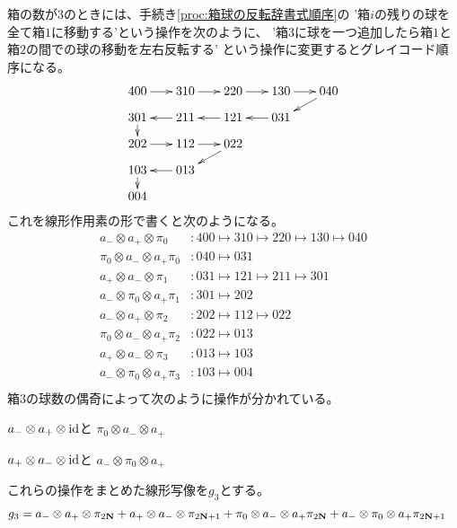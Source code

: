	箱の数が$3$のときには、手続き\ref{proc:箱球の反転辞書式順序}の
	'箱$i$の残りの球を全て箱$1$に移動する'という操作を次のように、
	'箱$3$に球を一つ追加したら箱$1$と箱$2$の間での球の移動を左右反転する'
	という操作に変更するとグレイコード順序になる。
	\begin{equation*}\xymatrix@R=2ex@C=4ex{ %
		400\ar[r] & 310\ar[r] & 220\ar[r] & 130\ar[r] & 040\ar[dl] \\
		301\ar[d] & 211\ar[l] & 121\ar[l] & 031\ar[l] \\
		202\ar[r] & 112\ar[r] & 022 \ar[dl] \\
		103\ar[d] & 013\ar[l] \\
		004 \\
	}\end{equation*} %
	これを線形作用素の形で書くと次のようになる。
	\begin{equation*}\begin{split} %
		a_-\otimes a_+\otimes \pi_0
		&: 400\mapsto 310\mapsto 220\mapsto 130\mapsto 040 \\
		\pi_0\otimes a_-\otimes a_+\pi_0 &: 040\mapsto 031 \\
		a_+\otimes a_-\otimes \pi_1
		&: 031\mapsto 121\mapsto 211\mapsto 301 \\
		a_-\otimes \pi_0\otimes a_+\pi_1 &: 301\mapsto 202 \\
		a_-\otimes a_+\otimes \pi_2
		&: 202\mapsto 112\mapsto 022 \\
		\pi_0 \otimes a_-\otimes a_+\pi_2 &: 022\mapsto 013 \\
		a_+\otimes a_-\otimes \pi_3 &: 013\mapsto 103 \\
		a_-\otimes \pi_0\otimes a_+\pi_3 &: 103\mapsto 004 \\
	\end{split}\end{equation*} %
	箱$3$の球数の偶奇によって次のように操作が分かれている。
	\begin{description}\setlength{\itemsep}{-1mm} %
		\item[箱$3$の球の数が偶数] $a_-\otimes a_+\otimes\operatorname{id}$と
		$\pi_0\otimes a_-\otimes a_+$
		\item[箱$3$の球の数が奇数] $a_+\otimes a_-\otimes\operatorname{id}$と
		$a_-\otimes\pi_0\otimes a_+$
	\end{description} %
	これらの操作をまとめた線形写像を$g_3$とする。
	\begin{equation*}\begin{split} %
		g_3 &= a_-\otimes a_+\otimes \pi_\myeven 
		+ a_+\otimes a_-\otimes \pi_\myodd
		+ \pi_0\otimes a_-\otimes a_+\pi_\myeven 
		+ a_-\otimes \pi_0\otimes a_+\pi_\myodd
	\end{split}\end{equation*} %
